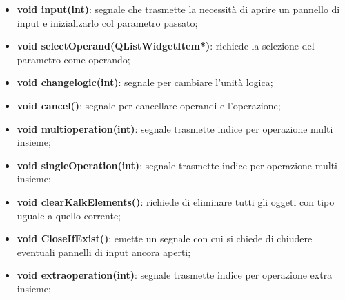 \documentclass[a4paper,10pt]{article}
\begin{document}
        \begin{itemize}
            \item \textbf{void input(int)}: segnale che trasmette la necessità di aprire un pannello di input e inizializarlo col parametro passato;
            \item \textbf{void selectOperand(QListWidgetItem*)}: richiede la selezione del parametro come operando;
            \item \textbf{void changelogic(int)}: segnale per cambiare l'unità logica;
            \item \textbf{void cancel()}: segnale per cancellare operandi e l'operazione;
            \item \textbf{void multioperation(int)}: segnale trasmette indice per operazione multi insieme;
            \item \textbf{void singleOperation(int)}: segnale trasmette indice per operazione multi insieme;
            \item \textbf{void clearKalkElements()}: richiede di eliminare tutti gli oggeti con tipo uguale a quello corrente;
            \item \textbf{void CloseIfExist()}: emette un segnale con cui si chiede di chiudere eventuali pannelli di input ancora aperti;
            \item \textbf{void extraoperation(int)}: segnale trasmette indice per operazione extra insieme;
        \end{itemize}
\end{document}
